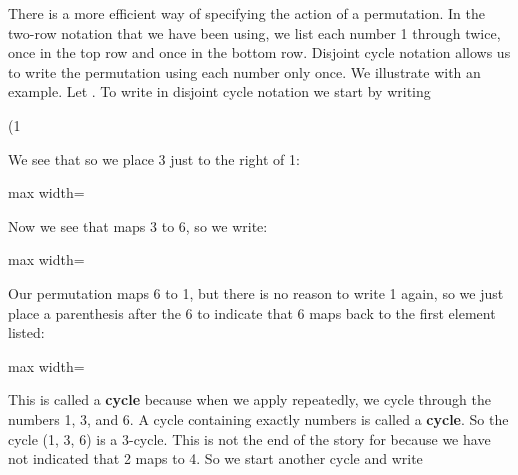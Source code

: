 \documentclass[11pt,oneside]{article}
\begin{document}
\begin{BookBody}

\noindent There is a more efficient way of specifying the action of a permutation. In the two-row notation that we have been using, we list each number 1 through  twice, once in the top row and once in the bottom row. Disjoint cycle notation allows us to write the permutation using each number only once. We illustrate with an example. Let \BookInline{\sigma = } . To write in disjoint cycle notation we start by writing

(1

\noindent We see that  so we place 3 just to the right of 1:

\begin{center}\begin{adjustbox}{max width=\linewidth}\end{adjustbox}\end{center}

\noindent Now we see that \BookInline{\sigma } maps 3 to 6, so we write:

\begin{center}\begin{adjustbox}{max width=\linewidth}\end{adjustbox}\end{center}

\noindent Our permutation maps 6 to 1, but there is no reason to write 1 again, so we just place a parenthesis after the 6 to indicate that 6 maps back to the first element listed:

\begin{center}\begin{adjustbox}{max width=\linewidth}\end{adjustbox}\end{center}

This is called a\textbf{ cycle} because when we apply \BookInline{\sigma } repeatedly, we cycle through the numbers 1, 3, and 6. A cycle containing exactly  numbers is called a \textbf{cycle}. So the cycle (1, 3, 6) is a 3-cycle. This is not the end of the story for \BookInline{\sigma } because we have not indicated that 2 maps to 4. So we start another cycle and write


\end{BookBody}
\end{document}
